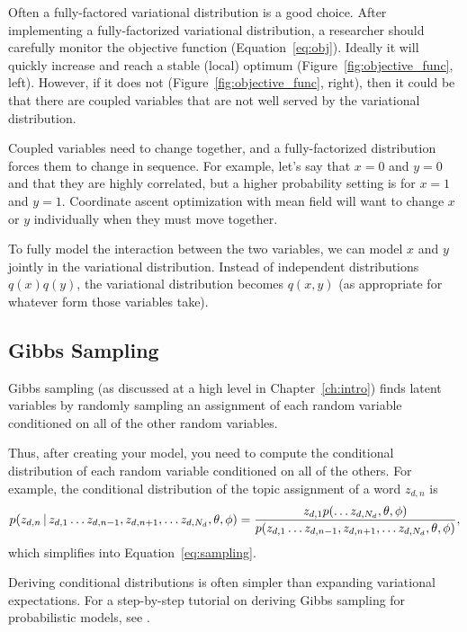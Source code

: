 Often a fully-factored variational distribution is a good choice.
After implementing a fully-factorized variational distribution, a
researcher should carefully monitor the objective function
(Equation~\ref{eq:obj}).  Ideally it will quickly increase and reach a
stable (local) optimum (Figure~\ref{fig:objective_func}, left).
However, if it does not (Figure~\ref{fig:objective_func}, right), then
it could be that there are coupled variables that are not well served
by the variational distribution.

Coupled variables need to change together, and a fully-factorized
distribution forces them to change in sequence.  For example, let's
say that $x=0$ and $y=0$ and that they are highly correlated, but a
higher probability setting is for $x=1$ and $y=1$.  Coordinate ascent
optimization with mean field will want to change $x$ or $y$
individually when they must move together.

To fully model the interaction between the two variables, we can model
$x$ and $y$ jointly in the variational distribution.  Instead of
independent distributions $q(x)q(y)$, the variational distribution
becomes $q(x,y)$ (as appropriate for whatever form those variables take).

\subsection{Gibbs Sampling}

Gibbs sampling (as discussed at a high level in Chapter~\ref{ch:intro}) finds
latent variables by randomly sampling an assignment of each random
variable conditioned on all of the other random variables.

Thus, after creating your model, you need to compute the conditional
distribution of each random variable conditioned on all of the
others.  For example, the conditional distribution of the topic
assignment of a word $z_{d,n}$ is
\begin{equation}
p(z_{d,n} \, | \, z_{d, 1} \dots z_{d, n-1}, z_{d, n+1}, \dots z_{d, N_d},
\theta, \phi) = \frac{z_{d, 1} p(\dots z_{d, N_d}, \theta, \phi)}{ p(z_{d, 1} \dots z_{d, n-1}, z_{d, n+1}, \dots z_{d, N_d},
\theta, \phi)},
\label{eq:gibbs_conditional}
\end{equation}
which simplifies into Equation~\ref{eq:sampling}.

Deriving conditional distributions is often simpler than expanding
variational expectations.  For a step-by-step tutorial on deriving
Gibbs sampling for probabilistic models, see \citet{hardisty-10}.

